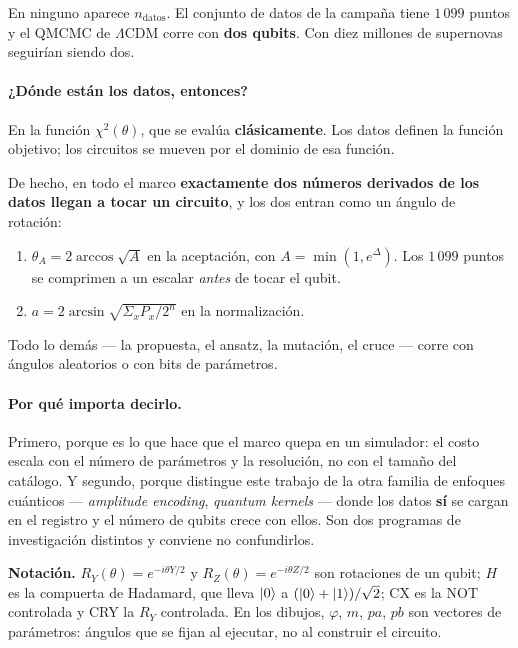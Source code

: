 \documentclass[11pt,a4paper]{article}
\begin{document}
\noindent
En ninguno aparece $n_{\text{datos}}$. El conjunto de datos de la campaña
tiene $1\,099$ puntos y el QMCMC de $\Lambda$CDM corre con \textbf{dos
qubits}. Con diez millones de supernovas seguirían siendo dos.

\paragraph{¿Dónde están los datos, entonces?} En la función
$\chi^2(\theta)$, que se evalúa \textbf{clásicamente}. Los datos definen la
función objetivo; los circuitos se mueven por el dominio de esa función.

De hecho, en todo el marco \textbf{exactamente dos números derivados de los
datos llegan a tocar un circuito}, y los dos entran como un ángulo de
rotación:

\begin{enumerate}[leftmargin=1.6em]
  \item $\theta_A = 2\arccos\sqrt{A}$ en la aceptación, con
    $A = \min(1, e^{\Delta})$. Los $1\,099$ puntos se comprimen a un escalar
    \emph{antes} de tocar el qubit.
  \item $a = 2\arcsin\sqrt{\Sigma_x P_x / 2^n}$ en la normalización.
\end{enumerate}

\noindent
Todo lo demás --- la propuesta, el ansatz, la mutación, el cruce --- corre
con ángulos aleatorios o con bits de parámetros.

\paragraph{Por qué importa decirlo.} Primero, porque es lo que hace que el
marco quepa en un simulador: el costo escala con el número de parámetros y la
resolución, no con el tamaño del catálogo. Y segundo, porque distingue este
trabajo de la otra familia de enfoques cuánticos --- \emph{amplitude
encoding}, \emph{quantum kernels} --- donde los datos \textbf{sí} se cargan en
el registro y el número de qubits crece con ellos. Son dos programas de
investigación distintos y conviene no confundirlos.

\medskip\noindent
\textbf{Notación.} $R_Y(\theta)=e^{-i\theta Y/2}$ y
$R_Z(\theta)=e^{-i\theta Z/2}$ son rotaciones de un qubit;
$H$ es la compuerta de Hadamard, que lleva $\ket{0}$ a
$(\ket{0}+\ket{1})/\sqrt2$; CX es la NOT controlada y CRY la $R_Y$
controlada. En los dibujos, $\varphi$, $m$, $pa$, $pb$ son vectores de
parámetros: ángulos que se fijan al ejecutar, no al construir el circuito.
\end{document}

